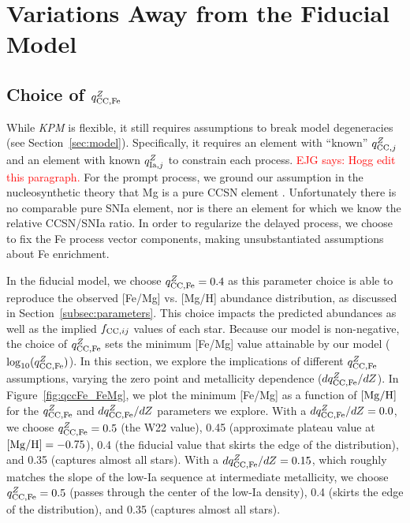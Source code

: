 \documentclass[modern]{aastex631}
\newcommand{\mgh}{[{\rm Mg}/{\rm H}]}
\newcommand{\qcc}{q_{{\rm CC,}j}^{Z}}
\newcommand{\qccFe}{q_{{\rm CC, Fe}}^{Z}}
\newcommand{\dqccFe}{dq_{{\rm CC, Fe}}^{Z}/dZ}
\newcommand{\qIa}{q_{{\rm Ia,}j}^{Z}}
\newcommand{\fcc}{f_{{\rm CC}, ij}}
\newcommand{\ejg}[1]{\textcolor{red}{EJG says: #1}}
\newcommand{\name}{\textsl{KPM}}
\begin{document}
\section{Variations Away from the Fiducial Model} \label{sec:variations}

\subsection{Choice of $\qccFe$} \label{subsec:qccFe}

While \name{} is flexible, it still requires assumptions to break model degeneracies (see Section~\ref{sec:model}). Specifically, it requires an element with ``known'' $\qcc$ and an element with known $\qIa$ to constrain each process. \ejg{Hogg edit this paragraph.} For the prompt process, we ground our assumption in the nucleosynthetic theory that Mg is a pure CCSN element \citep[e.g.,][]{andrews2017}. Unfortunately there is no comparable pure SNIa element, nor is there an element for which we know the relative CCSN/SNIa ratio. In order to regularize the delayed process, we choose to fix the Fe process vector components, making unsubstantiated assumptions about Fe enrichment. 

In the fiducial model, we choose $\qccFe = 0.4$ as this parameter choice is able to reproduce the observed [Fe/Mg] vs. [Mg/H] abundance distribution, as discussed in Section~\ref{subsec:parameters}. This choice impacts the predicted abundances as well as the implied $\fcc$ values of each star. Because our model is non-negative, the choice of $\qccFe$ sets the minimum [Fe/Mg] value attainable by our model ($\log_{10}(\qccFe)$). In this section, we explore the implications of different $\qccFe$ assumptions, varying the zero point and metallicity dependence ($\dqccFe$). In Figure~\ref{fig:qccFe_FeMg}, we plot the minimum [Fe/Mg] as a function of $\mgh$ for the $\qccFe$ and $\dqccFe$ parameters we explore. With a $\dqccFe=0.0$, we choose $\qccFe=0.5$ (the W22 value), 0.45 (approximate plateau value at $\mgh=-0.75$), 0.4 (the fiducial value that skirts the edge of the distribution), and 0.35 (captures almost all stars). With a $\dqccFe=0.15$, which roughly matches the slope of the low-Ia sequence at intermediate metallicity, we choose $\qccFe=0.5$ (passes through the center of the low-Ia density), 0.4 (skirts the edge of the distribution), and 0.35 (captures almost all stars).
\end{document}

